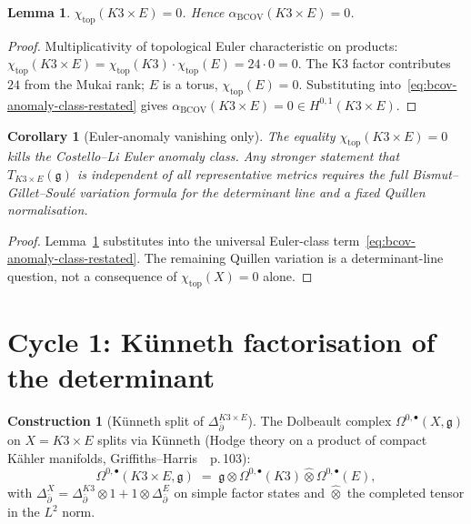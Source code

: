 \documentclass[11pt]{article}
\newtheorem{lemma}[theorem]{Lemma}
\newtheorem{corollary}[theorem]{Corollary}
\theoremstyle{definition}
\newtheorem{construction}[theorem]{Construction}
\providecommand{\frakg}{\mathfrak{g}}
\renewcommand{\Dbar}{\Delta_{\bar{\partial}}}
\providecommand{\BCOV}{\mathrm{BCOV}}
\begin{document}
\begin{lemma}
\label{lem:chi-top-vanishes}
$\chi_{\mathrm{top}}(K3\times E) = 0$. Hence $\alpha_{\BCOV}(K3\times E) = 0$.
\end{lemma}

\begin{proof}
Multiplicativity of topological Euler characteristic on products:
$\chi_{\mathrm{top}}(K3\times E) = \chi_{\mathrm{top}}(K3)\cdot
\chi_{\mathrm{top}}(E) = 24\cdot 0 = 0$. The K3 factor contributes $24$
from the Mukai rank; $E$ is a torus, $\chi_{\mathrm{top}}(E) = 0$.
Substituting into~\eqref{eq:bcov-anomaly-class-restated} gives
$\alpha_{\BCOV}(K3\times E) = 0\in H^{0,1}(K3\times E)$.
\end{proof}

\begin{corollary}[Euler-anomaly vanishing only]
\label{cor:metric-indep}
The equality $\chi_{\mathrm{top}}(K3\times E)=0$ kills the
Costello--Li Euler anomaly class. Any stronger statement that
$T_{K3\times E}(\frakg)$ is independent of all representative metrics
requires the full Bismut--Gillet--Soul\'e variation formula for the
determinant line and a fixed Quillen normalisation.
\end{corollary}

\begin{proof}
Lemma~\ref{lem:chi-top-vanishes} substitutes into the universal
Euler-class term~\eqref{eq:bcov-anomaly-class-restated}. The remaining
Quillen variation is a determinant-line question, not a consequence of
$\chi_{\mathrm{top}}(X)=0$ alone.
\end{proof}

\section{Cycle 1: K\"unneth factorisation of the determinant}
\label{sec:cycle-1}

\begin{construction}[K\"unneth split of $\Dbar^{K3\times E}$]
\label{con:kunneth-split}
The Dolbeault complex $\Omega^{0,\bullet}(X,\frakg)$ on $X = K3\times E$
splits via K\"unneth (Hodge theory on a product of compact K\"ahler
manifolds, Griffiths--Harris~\cite{GriffithsHarris1978}~p.\,103):
\begin{equation}
\label{eq:kunneth-dolbeault}
\Omega^{0,\bullet}(K3\times E,\frakg)
\;=\; \frakg\otimes\Omega^{0,\bullet}(K3)\hat\otimes\Omega^{0,\bullet}(E),
\end{equation}
with $\Dbar^X = \Dbar^{K3}\otimes 1 + 1\otimes \Dbar^E$ on simple
factor states and $\hat\otimes$ the completed tensor in the $L^2$ norm.
\end{construction}
\end{document}
